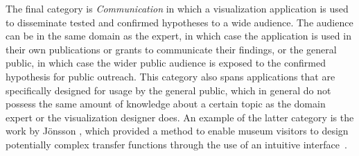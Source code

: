 
The final category is \emph{Communication} in which a visualization application is used to disseminate tested and confirmed hypotheses to a wide audience.  The audience can be in the same domain as the expert, in which case the application is used in their own publications or grants to communicate their findings, or the general public, in which case the wider public audience is exposed to the confirmed hypothesis for public outreach.  This category also spans applications that are specifically designed for usage by the general public, which in general do not possess the same amount of knowledge about a certain topic as the domain expert or the visualization designer does.  An example of the latter category is the work by J\"onsson \etal , which provided a method to enable museum visitors to design potentially complex transfer functions through the use of an intuitive interface~\cite{jonsson2016intuitive}.

